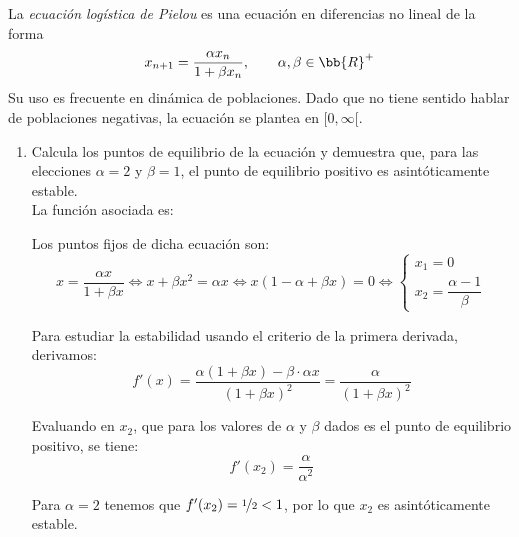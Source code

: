 \begin{ejercicio}
    La \emph{ecuación logística de Pielou} es una ecuación en diferencias no lineal de la forma
    \begin{equation*}
        x_{n+1} = \frac{\alpha x_n}{1+\beta x_n},\qquad \alpha,\beta\in \bb{R}^+
    \end{equation*}
    Su uso es frecuente en dinámica de poblaciones. Dado que no tiene sentido hablar de poblaciones negativas, la
    ecuación se plantea en $[0, \infty[$.
    \begin{enumerate}
        \item Calcula los puntos de equilibrio de la ecuación y demuestra que, para las elecciones $\alpha = 2$ y $\beta = 1$, el punto de equilibrio positivo es asintóticamente estable.\\

        La función asociada es:
        \Func{f}{[0, \infty[}{[0, \infty[}{x}{\dfrac{\alpha x}{1+\beta x}}

        Los puntos fijos de dicha ecuación son:
        \begin{equation*}
            x = \dfrac{\alpha x}{1+\beta x}
            \Longleftrightarrow
            x + \beta x^2 = \alpha x
            \Longleftrightarrow
            x(1-\alpha+\beta x) = 0
            \Longleftrightarrow
            \left\{
            \begin{array}{l}
                x_1=0\\
                x_2=\dfrac{\alpha-1}{\beta}
            \end{array}
            \right.
        \end{equation*}

        Para estudiar la estabilidad usando el criterio de la primera derivada, derivamos:
        \begin{equation*}
            f'(x)=\frac{\alpha(1+\beta x)-\beta\cdot \alpha x}{(1+\beta x)^2}
            =\frac{\alpha}{(1+\beta x)^2}
        \end{equation*}

        Evaluando en $x_2$, que para los valores de $\alpha$ y $\beta$ dados es el punto de equilibrio positivo, se tiene:
        \begin{equation*}
            f'(x_2)
            = \frac{\alpha}{\alpha^2}
        \end{equation*}

        Para $\alpha=2$ tenemos que $f'(x_2)=\nicefrac{1}{2}<1$, por lo que $x_2$ es asintóticamente estable.
        

\end{enumerate}
\end{ejercicio}
